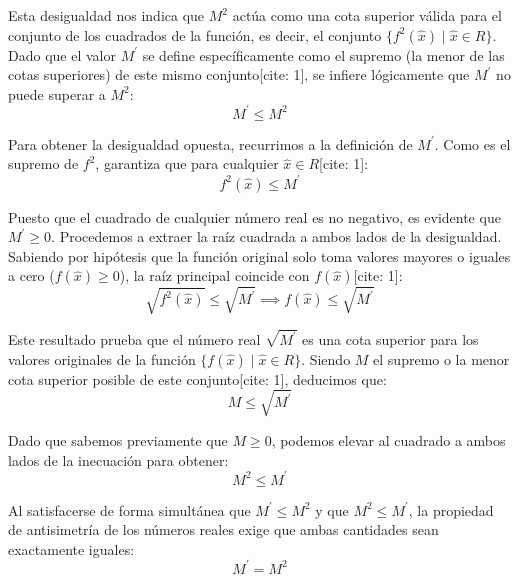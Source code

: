 \documentclass[11pt,letterpaper]{article}
\begin{document}
Esta desigualdad nos indica que $M^{2}$ actúa como una cota superior válida para el conjunto de los cuadrados de la función, es decir, el conjunto $\{f^{2}(\hat{x}) \mid \hat{x} \in R\}$. Dado que el valor $M^{\prime}$ se define específicamente como el supremo (la menor de las cotas superiores) de este mismo conjunto[cite: 1], se infiere lógicamente que $M^{\prime}$ no puede superar a $M^{2}$:
\begin{equation*}
M^{\prime} \le M^{2}
\end{equation*}

Para obtener la desigualdad opuesta, recurrimos a la definición de $M^{\prime}$. Como es el supremo de $f^{2}$, garantiza que para cualquier $\hat{x} \in R$[cite: 1]:
\begin{equation*}
f^{2}(\hat{x}) \le M^{\prime}
\end{equation*}

Puesto que el cuadrado de cualquier número real es no negativo, es evidente que $M^{\prime} \ge 0$. Procedemos a extraer la raíz cuadrada a ambos lados de la desigualdad. Sabiendo por hipótesis que la función original solo toma valores mayores o iguales a cero ($f(\hat{x}) \ge 0$), la raíz principal coincide con $f(\hat{x})$[cite: 1]:
\begin{equation*}
\sqrt{f^{2}(\hat{x})} \le \sqrt{M^{\prime}} \implies f(\hat{x}) \le \sqrt{M^{\prime}}
\end{equation*}

Este resultado prueba que el número real $\sqrt{M^{\prime}}$ es una cota superior para los valores originales de la función $\{f(\hat{x}) \mid \hat{x} \in R\}$. Siendo $M$ el supremo o la menor cota superior posible de este conjunto[cite: 1], deducimos que:
\begin{equation*}
M \le \sqrt{M^{\prime}}
\end{equation*}

Dado que sabemos previamente que $M \ge 0$, podemos elevar al cuadrado a ambos lados de la inecuación para obtener:
\begin{equation*}
M^{2} \le M^{\prime}
\end{equation*}

Al satisfacerse de forma simultánea que $M^{\prime} \le M^{2}$ y que $M^{2} \le M^{\prime}$, la propiedad de antisimetría de los números reales exige que ambas cantidades sean exactamente iguales:
\begin{equation*}
M^{\prime} = M^{2}
\end{equation*}
\end{document}
